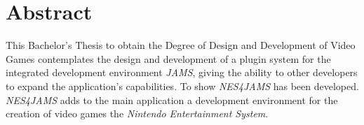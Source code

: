 \chapter{Abstract} \label{ch:abstract}

This Bachelor's Thesis to obtain the Degree of Design
and Development of Video Games contemplates the design
and development of a plugin system for the integrated
development environment \textit{JAMS},
giving the ability to other developers to expand the
application's capabilities.
To show  \textit{NES4JAMS} has been developed. \emph{NES4JAMS} adds to the main application
a development environment for the creation of
video games   the
\textit{Nintendo Entertainment System}.
